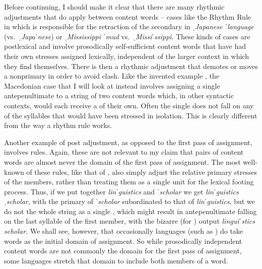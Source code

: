 \documentclass[output=paper,
modfonts
]{LSP/langsci}
\begin{document}
Before continuing, I should make it clear that there are many rhythmic adjustments that do apply between content words -- cases like the Rhythm Rule in  \citep{hayes1984k} which is responsible for the retraction of the secondary  in ˌ\textit{Japanese ˈlanguage} (vs.\ ˌ\textit{Japaˈnese}) or \textit{ˌMississippi ˈmud} vs.\ \textit{ˌMissiˈssippi}. These kinds of cases are postlexical and involve prosodically self-sufficient content words that have had their own stresses assigned lexically, independent of the larger context in which they find themselves. There is then a rhythmic adjustment that demotes or moves a nonprimary  in order to avoid  clash. Like the invented example , the Macedonian case that I will look at instead involves assigning a single antepenultimate  to a string of two content words which, in other syntactic contexts, would each receive a  of their own. Often the single  does not fall on any of the syllables that would have been stressed in isolation. This is clearly different from the way a rhythm rule works. 

Another example of post adjustment, as opposed to the first pass of  assignment, involves   rules. Again, these are not relevant to my claim that pairs of content words are almost never the domain of the first pass of  assignment. The most well-known of these   rules, like that of , also simply adjust the relative primary stresses of the members, rather than treating them as a single unit for the lexical footing process. Thus, if we put together \textit{linˈguistics} and \textit{ˈscholar} we get \textit{linˈguistics ˌscholar}, with the primary  of \textit{ˈscholar} subordinated to that of \textit{linˈguistics}, but we do not  the whole string as a single , which might result in antepenultimate  falling on the last syllable of the first member, with the bizarre (for ) output \textit{linguiˈstics scholar}. We shall see, however, that occasionally languages (such as ) do take  words as the initial domain of  assignment. So while prosodically independent content words are not commonly the domain for the first pass of  assignment, some languages stretch that domain to include both members of a  word. 
\end{document}
